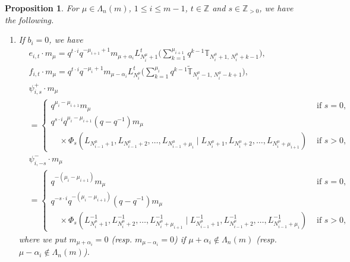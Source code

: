 \documentclass[12pt]{amsart}
\newtheorem{prop}[thm]{Proposition}
\numberwithin{equation}{thm}
\newcommand\TT{\mathbb T}
\newcommand\ZZ{\mathbb Z}
\renewcommand\a{\alpha}  %
\newcommand\vL{\varLambda}
\newcommand\wt{\widetilde}
\begin{document}
\begin{prop} 
\label{Prop act uqbm Mmu} 
For $\mu \in \vL_n(m)$, $1 \leq i \leq m-1$, $t \in \ZZ$ and $s \in \ZZ_{> 0}$, we have the following. 
\begin{enumerate}
\item 
If $b_i=0$, we have 
\begin{align*}
&e_{i,t} \cdot m_{\mu} 
	= q^{t \cdot i} q^{- \mu_{i+1} +1}  m_{\mu + \a_i} L_{N_i^{\mu}+1}^t 
		\Big( \sum_{k=1}^{\mu_{i+1}} q^{k-1} \TT_{N_i^{\mu} +1, \, N_i^{\mu} + k-1}\Big), 
\\
&f_{i,t} \cdot m_{\mu} 
	= q^{t \cdot i} q^{- \mu_i +1} m_{\mu - \a_i} L_{N_i^{\mu}}^t 
		\Big( \sum_{k=1}^{\mu_i} q^{k-1} \wt{\TT}_{N_i^{\mu}-1, \, N_i^{\mu} -k +1} \Big), 
\\
&\psi_{i, s}^+ \cdot m_{\mu} 
	\\ &= \begin{cases}
		q^{\mu_i - \mu_{i+1}} m_{\mu} &  \text{ if } s=0, 
		\\
		q^{s \cdot i} q^{\mu_i-\mu_{i+1}} (q-q^{-1}) m_{\mu} 
			\\ \quad \times 
			\Phi_s (L_{N_{i-1}^{\mu}+1}, L_{N_{i-1}^{\mu} +2}, \dots, L_{N_{i-1}^{\mu} + \mu_i} 
					\mid L_{N_i^{\mu}+1}, L_{N_i^{\mu} +2}, \dots, L_{N_i^{\mu} + \mu_{i+1}})
			 & \text{ if } s >0,
		\end{cases} 
\\
& \psi_{i, -s}^- \cdot m_{\mu} 
	\\ &= \begin{cases}
		q^{-(\mu_i - \mu_{i+1})} m_{\mu} & \text{ if } s=0, 
		\\ 
		q^{- s \cdot i} q^{-(\mu_i - \mu_{i+1})} (q-q^{-1}) m_{\mu} 
			\\ \quad \times 
			\Phi_s (L_{N_i^{\mu} +1}^{-1}, L_{N_i^{\mu}+2}^{-1}, \dots, L_{N_i^{\mu}+\mu_{i+1}}^{-1} 
				\mid L_{N_{i-1}^{\mu} +1}^{-1}, L_{N_{i-1}^{\mu} +2}^{-1}, \dots, L_{N_{i-1}^{\mu} +\mu_i}^{-1}) 
			& \text{ if } s >0, 
		\end{cases}
\end{align*}
where we put $m_{\mu+\a_i} =0$ (resp. $m_{\mu -\a_i} =0$) if $\mu+\a_i \not\in \vL_n(m)$  (resp. $\mu - \a_i \not\in \vL_n(m)$). 


\end{enumerate}
\end{prop}
\end{document}
